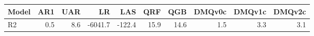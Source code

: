 \begin{tabular}{lrrrrrrrrr}
\toprule
Model & AR1 & UAR & LR & LAS & QRF & QGB & DMQv0c & DMQv1c & DMQv2c \\
\midrule
R2 & 0.5 & 8.6 & -6041.7 & -122.4 & 15.9 & 14.6 & 1.5 & 3.3 & 3.1 \\
\bottomrule
\end{tabular}
